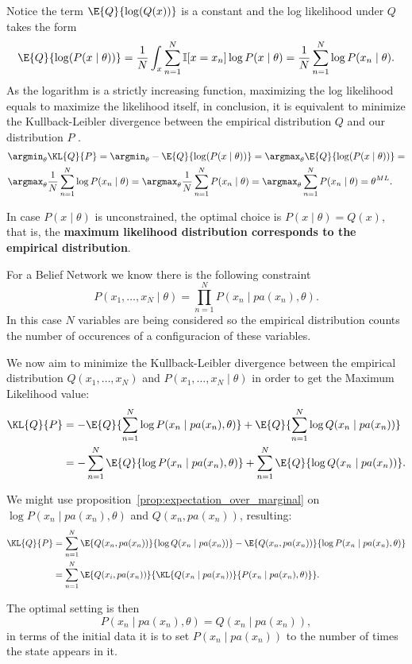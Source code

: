 Notice the term \(\E{Q}{\log(Q(x))}\) is a constant and the log likelihood under \(Q\) takes the form
\[
   \E{Q}{\log(P(x \mid \theta))} = \frac{1}{N}\int_{x}\sum_{n=1}^{N}\mathbb{I}[x = x_{n}]\log{P(x \mid \theta)} = \frac{1}{N}\sum_{n = 1}^N \log{P(x_n \mid \theta)}.
 \]
 As the logarithm is
 a strictly increasing function, maximizing the log likelihood equals to
 maximize the likelihood itself, in conclusion, it is equivalent to
 minimize the Kullback-Leibler divergence between the empirical distribution \( Q \)  and our distribution \( P \) .
 \[
   \begin{aligned}
     &\argmin_{\theta} \KL{Q}{P} = \argmin_{\theta} - \E{Q}{\log(P(x \mid \theta))} =  \argmax_{\theta} \E{Q}{\log(P(x \mid \theta))} =\\
     &\argmax_{\theta} \frac{1}{N}\sum_{n=1}^{N}\log{P(x_{n} \mid \theta)} =  \argmax_{\theta} \frac{1}{N}\sum_{n=1}^{N}P(x_{n} \mid \theta) = \argmax_{\theta} \sum_{n=1}^{N}P(x_{n}\mid \theta)= \theta^{ML}.
   \end{aligned}
 \]

 In case \(P(x \mid \theta)\) is unconstrained, the optimal choice is \(P(x \mid \theta) = Q(x)\), that
 is, the \textbf{maximum likelihood distribution corresponds to the empirical distribution}.

 For a Belief Network we know there is the following constraint
 \[
   P(x_{1}, \dots, x_{N} \mid \theta) = \prod_{n = 1}^N P(x_n  \mid  pa(x_n), \theta).
 \]
 In this case \( N \) variables are being considered so the empirical distribution counts the number of occurences of a configuracion of these variables.

 We now aim to minimize the Kullback-Leibler divergence between the empirical
 distribution \(Q(x_1,\dots,x_N)\) and \(P(x_1, \dots, x_N \mid \theta)\) in order to get the Maximum Likelihood value:
 \[
   \begin{aligned}
   \KL{Q}{P} &= - \E{Q}{\sum_{n = 1}^N\log{P(x_n \mid pa(x_n), \theta)}} +
   \E{Q}{\sum_{n = 1}^N\log{Q(x_n \mid pa(x_n))}}
   \\ &= - \sum_{n = 1}^N \E{Q}{\log{P(x_n \mid pa(x_n), \theta)}} + \sum_{n =
     1}^N \E{Q}{\log{Q(x_n \mid pa(x_n))}}.
   \end{aligned}
 \]

We might use proposition~\ref{prop:expectation_over_marginal} on \(\log{P(x_n \mid pa(x_n), \theta)}\) and \(Q(x_{n}, pa(x_{n}))\), resulting:
 \[
   \begin{aligned}
     \KL{Q}{P} &= \sum_{n = 1}^N \E{Q(x_n,pa(x_n))}{\log{Q(x_n \mid pa(x_n))}} - \E{Q(x_n,pa(x_n))}{\log{P(x_n \mid pa(x_n), \theta)}}\\
     &= \sum_{n = 1}^N \E{Q(x_i,pa(x_n))}{\KL{Q(x_n \mid pa(x_n))}{P(x_n \mid pa(x_n), \theta)}}.
   \end{aligned}
 \]

 The optimal setting is then
 \[
   P(x_n \mid pa(x_n), \theta) = Q(x_n \mid pa(x_n)),
 \]
 in terms of the initial data it is to set \(P(x_n \mid pa(x_n))\) to the number of
 times the state appears in it.
